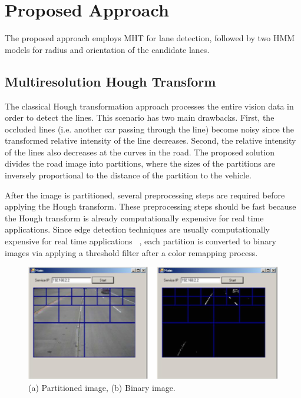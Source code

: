 \documentclass[a4paper,oneside,10pt]{article}
\begin{document}
\section{Proposed Approach}
\label{sec:pa}

The proposed approach employs MHT for lane detection, followed by two HMM models for radius and orientation of the candidate lanes.


\subsection{Multiresolution Hough Transform}

The classical Hough transformation approach processes the entire vision data in order to detect the lines. This scenario has two main drawbacks. First, the occluded lines (i.e. another car passing through the line) become noisy since the transformed relative intensity of the line decreases. Second, the relative intensity of the lines also decreases at the curves in the road. The proposed solution divides the road image into partitions, where the sizes of the partitions are inversely proportional to the distance of the partition to the vehicle. 

After the image is partitioned, several preprocessing steps are required before applying the Hough transform. These preprocessing steps should be fast because the Hough transform is already computationally expensive for real time applications. Since edge detection techniques are usually computationally expensive for real time applications ~\cite{canny86,ratnayake06}, each partition is converted to binary images via applying a threshold filter after a color remapping process. 

\begin{figure}
\begin{center}
\includegraphics[scale=0.5]{fig1}
\end{center}
\caption{(a) Partitioned image, (b) Binary image.}
\label{aba:fig1}
\end{figure} 
\end{document}
